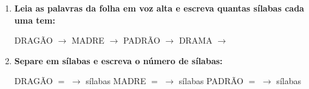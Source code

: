 \begin{exercicio}
\begin{enumerate}[resume]
  \item \textbf{Leia as palavras da folha em voz alta e escreva quantas sílabas cada uma tem:}

  \begin{center}
  DRAGÃO $\rightarrow$ \underline{\hspace{1cm}} \quad MADRE $\rightarrow$ \underline{\hspace{1cm}} \quad PADRÃO $\rightarrow$ \underline{\hspace{1cm}} \quad DRAMA $\rightarrow$ \underline{\hspace{1cm}}
  \end{center}

  \item \textbf{Separe em sílabas e escreva o número de sílabas:}
  \begin{center}
  DRAGÃO $=$ \underline{\hspace{1.2cm}} $\rightarrow$ \underline{\hspace{0.8cm}} sílabas \quad MADRE $=$ \underline{\hspace{1.2cm}} $\rightarrow$ \underline{\hspace{0.8cm}} sílabas \quad PADRÃO $=$ \underline{\hspace{1.2cm}} $\rightarrow$ \underline{\hspace{0.8cm}} sílabas
  \end{center}

\end{enumerate}

\end{exercicio}



